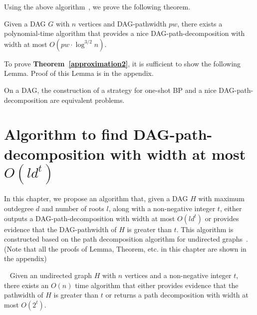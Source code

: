 \documentclass[runningheads]{llncs}
\theoremstyle{plain}
\theoremstyle{definition}
\begin{document}
Using the above algorithm~\cite{art20}, we prove the following theorem.

\begin{theorem}\label{approximation2}
    Given a DAG $G$ with $n$ vertices and DAG-pathwidth $pw$, there exists a polynomial-time algorithm that provides a nice DAG-path-decomposition with width at most $O(pw \cdot \log ^{3/2} n)$.
\end{theorem}

To prove \textbf{Theorem~\ref{approximation2}}, it is sufficient to show the following Lemma. Proof of this Lemma is in the appendix.

\begin{lemma}\label{lemma_approximation2}
    On a DAG, the construction of a strategy for one-shot BP and a nice DAG-path-decomposition are equivalent problems.
\end{lemma}


















\section{Algorithm to find DAG-path-decomposition with width at most $O(ld^t)$}\label{chapter5}

In this chapter, we propose an algorithm that, given a DAG $H$ with maximum outdegree $d$ and number of roots $l$, along with a non-negative integer $t$, either outputs a DAG-path-decomposition with width at most $O(ld^t)$ or provides evidence that the DAG-pathwidth of $H$ is greater than $t$. This algorithm is constructed based on the path decomposition algorithm for undirected graphs~\cite{art8}. (Note that all the proofs of Lemma, Theorem, etc. in this chapter are shown in the appendix)

\begin{proposition}{~\cite{art8}}\label{pathwidth algorithm of undirected graph}
    Given an undirected graph $H$ with $n$ vertices and a non-negative integer $t$, there exists an $O(n)$ time algorithm that either provides evidence that the pathwidth of $H$ is greater than $t$ or returns a path decomposition with width at most $O(2^t)$.
\end{proposition}
\end{document}
